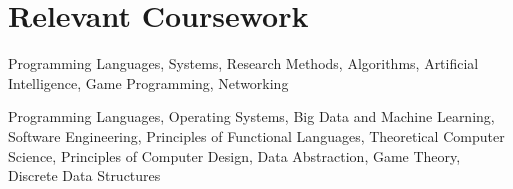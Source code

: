 \section{Relevant Coursework}

%
{}%
{}%
{}%
{Programming Languages, Systems, Research Methods, Algorithms, Artificial
Intelligence, Game Programming, Networking%
\newline{}
}

%
{}%
{}%
{}%
{Programming Languages, Operating Systems, Big Data and Machine Learning,
Software Engineering, Principles of Functional Languages, Theoretical Computer
Science, Principles of Computer Design, Data Abstraction, Game Theory, Discrete
Data Structures
\newline{}
}